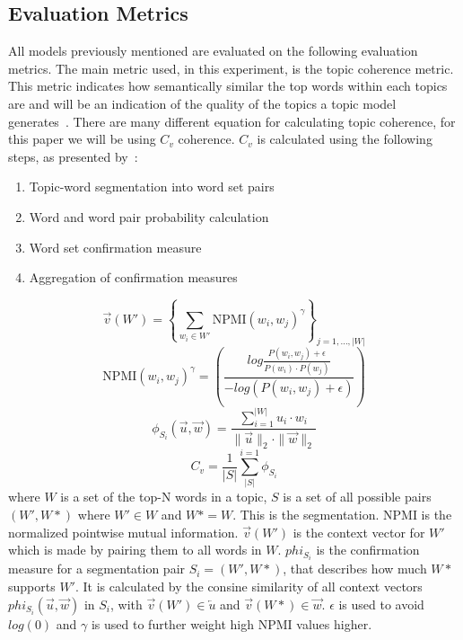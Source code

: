 \subsection{Evaluation Metrics}\label{sec:experiment_metrics}
All models previously mentioned are evaluated on the following evaluation metrics.
The main metric used, in this experiment, is the topic coherence metric.
This metric indicates how semantically similar the top words within each topics are and will be an indication of the quality of the topics a topic model generates~\cite{topic_coherence_2015}.
There are many different equation for calculating topic coherence, for this paper we will be using $C_v$ coherence.
$C_v$ is calculated using the following steps, as presented by~\citet{Syed2017coherence}:
\begin{enumerate}
	\item Topic-word segmentation into word set pairs
	\item Word and word pair probability calculation
	\item Word set confirmation measure
	\item Aggregation of confirmation measures
\end{enumerate}
\begin{equation}
	\overrightarrow{v}(W') = \left\{ \sum_{w_i \in W'} \text{NPMI}(w_i, w_j)^\gamma \right\}_{j=1,\dots,|W|}
\end{equation}
\begin{equation}
	\text{NPMI}(w_i,w_j)^\gamma = \left( \frac
	{log\frac{P(w_i,w_j) + \epsilon}{P(w_i)\cdot P(w_j)}}
	{-log(P(w_i,w_j) + \epsilon)} \right)
\end{equation}
\begin{equation}
	\phi_{S_i}(\overrightarrow{u}, \overrightarrow{w}) = \frac
	{\sum_{i = 1}^{|W|} u_i \cdot w_i}
	{\|\overrightarrow{u}\|_2 \cdot \|\overrightarrow{w}\|_2}
\end{equation}
\begin{equation}
	C_v = \frac{1}{|S|}\sum_{|S|}^{i=1}\phi_{S_i}
\end{equation}
\noindent where $W$ is a set of the top-N words in a topic, $S$ is a set of all possible pairs $(W',W*)$ where $W'\in W$ and $W* = W$. This is the segmentation.
NPMI is the normalized pointwise mutual information.
$\overrightarrow{v}(W')$ is the context vector for $W'$ which is made by pairing them to all words in $W$.
$phi_{S_i}$ is the confirmation measure for a segmentation pair $S_i = (W',W*)$, that describes how much $W*$ supports $W'$.
It is calculated by the consine similarity of all context vectors $phi_{S_i}(\overrightarrow{u},\overrightarrow{w})$ in $S_i$, with $\overrightarrow{v}(W') \in \overleftarrow{u}$ and $\overrightarrow{v}(W*) \in \overrightarrow{w}$.
$\epsilon$ is used to avoid $log(0)$ and $\gamma$ is used to further weight high NPMI values higher.

